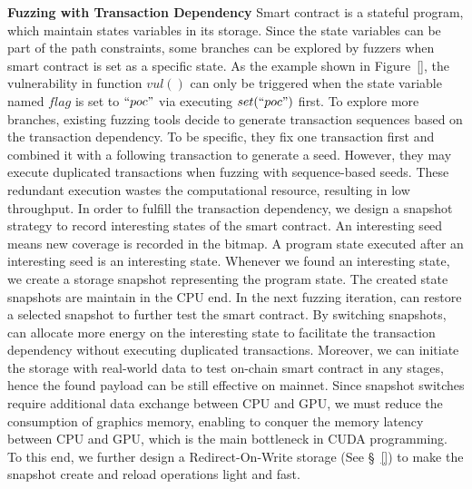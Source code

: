 \noindent \textbf{Fuzzing with Transaction Dependency}
\label{design:snapshot}
Smart contract is a stateful program, which maintain states variables in its storage. Since the state variables can be part of the path constraints, some branches can be explored by fuzzers when smart contract is set as a specific state. 
%
As the example shown in Figure~\ref{}, the vulnerability in function $vul()$ can only be triggered when the state variable named $flag$ is set to $``poc"$ via executing $set(``poc")$ first. 
%
To explore more branches, existing fuzzing tools decide to generate transaction sequences based on the transaction dependency\cite{confuzzie, echidna}. 
To be specific, they fix one transaction first and combined it with a following transaction to generate a seed. However, they may execute duplicated transactions when fuzzing with sequence-based seeds. These redundant execution wastes the computational resource, resulting in low throughput. 
%
%
In order to fulfill the transaction dependency, we design a snapshot strategy to record interesting states of the smart contract. An interesting seed means new coverage is recorded in the bitmap. A program state executed after an interesting seed is an interesting state. 
Whenever we found an interesting state, we create a storage snapshot representing the program state. 
The created state snapshots are maintain in the CPU end. 
In the next fuzzing iteration, {\tool} can restore a selected snapshot to further test the smart contract.
By switching snapshots, {\tool} can allocate more energy on the interesting state to facilitate the transaction dependency without executing duplicated transactions. Moreover, we can initiate the storage with real-world data to test on-chain smart contract in any stages, hence the found payload can be still effective on mainnet. 
%
Since snapshot switches require additional data exchange between CPU and GPU, we must reduce the consumption of graphics memory, enabling {\tool} to conquer the memory latency between CPU and GPU, which is the main bottleneck in CUDA programming. 
To this end, we further design a Redirect-On-Write storage (See \S~\ref{}) to make the snapshot create and reload operations light and fast.


